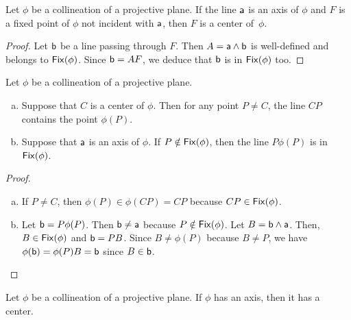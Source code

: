 \begin{lem}\label{lem:fixed-not-axis-is-center}
    Let\/ $\phi$ be a collineation of a projective plane. If the line\/ $\mathsf a$ is an axis of\/ $\phi$ and\/ $F$ is a fixed point of\/ $\phi$ not incident with\/ $\mathsf a$, then\/ $F$ is a center of\/~$\phi$.
\end{lem}

\begin{proof}
    Let $\mathsf b$ be a line passing through $F$. Then $A=\mathsf a\wedge\mathsf b$ is well-defined and belongs to $\operatorname{\mathsf{Fix}}(\phi)$. Since $\mathsf b=AF$, we deduce that $\mathsf b$ is in $\operatorname{\mathsf{Fix}}(\phi)$ too.
\end{proof}

\begin{lem}\label{lem:P-and-phi(P)}
    Let\/ $\phi$ be a collineation of a projective plane.
    \begin{enumerate}[a),font=\upshape]
        \item Suppose that\/ $C$ is a center of\/ $\phi$. Then for any point\/ $P \ne C$, the line\/ $CP$ contains the point\/ $\phi(P)$.
        \item Suppose that\/ $\mathsf a$ is an axis of\/ $\phi$. If\/ $P\notin\operatorname{\mathsf{Fix}}(\phi)$, then the line\/ $P\phi(P)$ is in\/ $\operatorname{\mathsf{Fix}}(\phi)$.
    \end{enumerate}
\end{lem}

\begin{proof}${}$
    \begin{enumerate}[a)]
        \item If $P\ne C$, then $\phi(P)\in\phi(CP)=CP$ because $CP\in\operatorname{\mathsf{Fix}}(\phi)$.

        \item Let $\mathsf b=P\phi(P)$. Then $\mathsf b\ne\mathsf a$ because $P\notin\operatorname{\mathsf{Fix}}(\phi)$. Let $B=\mathsf b\wedge\mathsf a$. Then, $B\in\operatorname{\mathsf{Fix}}(\phi)$ and $\mathsf b=PB$. Since $B\ne\phi(P)$ because $B\ne P$, we have $\phi(\mathsf b)=\phi(P)B=\mathsf b$ since $B\in\mathsf b$. %
    \end{enumerate}
    
\end{proof}

\begin{thm}\label{thm:axis-iff-center}
    Let\/ $\phi$ be a collineation of a projective plane. If\/ $\phi$ has an axis, then it has a center.
\end{thm}

